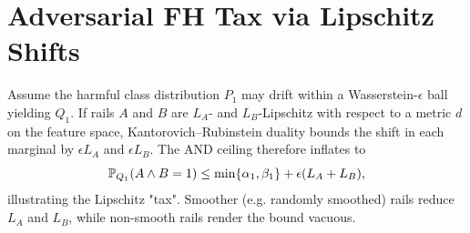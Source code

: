\section{Adversarial FH Tax via Lipschitz Shifts}
Assume the harmful class distribution $P_1$ may drift within a Wasserstein-$\epsilon$ ball yielding
$Q_1$. If rails $A$ and $B$ are $L_A$- and $L_B$-Lipschitz with respect to a metric $d$ on the feature
space, Kantorovich--Rubinstein duality bounds the shift in each marginal by $\epsilon L_A$ and
$\epsilon L_B$. The AND ceiling therefore inflates to
\[
\mathbb{P}_{Q_1}(A\wedge B=1) \le \min\{\alpha_1,\beta_1\} + \epsilon (L_A + L_B),
\]
illustrating the Lipschitz "tax". Smoother (e.g. randomly smoothed) rails reduce $L_A$ and $L_B$, while
non-smooth rails render the bound vacuous.
